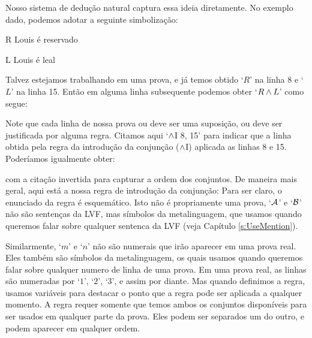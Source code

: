 Nosso sistema de dedu\c c\~ao natural  captura  essa ideia diretamente. No exemplo dado, podemos adotar a seguinte simboliza\c c\~ao:
	\begin{ekey}
		\item[R] Louis \'e reservado
		\item[L] Louis \'e leal
	\end{ekey}
 Talvez estejamos trabalhando em uma prova, e j\'a temos obtido `$R$'  na linha 8 e `$L$' na linha 15. Ent\~ao  em alguma linha subsequente podemos obter  `$R \wedge L$' como segue:
\begin{fitchproof}
	 
\end{fitchproof}

 Note que cada linha de nossa prova  ou deve ser uma suposi\c c\~ao, ou deve ser justificada por alguma regra.    Citamos  aqui   `$\wedge$I 8, 15' para indicar que a linha obtida pela regra da introdu\c c\~ao  da conjun\c c\~ao  ($\wedge$I) aplicada as linhas 8 e 15.  Poder\'iamos igualmente obter:
\begin{fitchproof}
	 
\end{fitchproof}
 
 com a cita\c c\~ao invertida para capturar a ordem  dos  conjuntos. 
De maneira mais geral, aqui est\'a  a nossa regra de introdu\c c\~ao da  conjun\c c\~ao:
Para ser claro, o enunciado da regra \'e esquem\'atico.  Isto n\~ao \'e propriamente uma prova,      `$\mathcal{A}$'  e `$\mathcal{B}$'  n\~ao s\~ao senten\c cas da LVF, mas s\'imbolos da metalinguagem, que usamos quando queremos falar sobre qualquer sentenca da LVF (veja Cap\'itulo \ref{s:UseMention}). 

Similarmente,  `$m$' e `$n$' n\~ao s\~ao numerais  que ir\~ao aparecer em uma prova real. Eles tamb\'em s\~ao s\'imbolos da metalinguagem, os quais usamos quando queremos falar sobre qualquer numero de linha  de uma prova. Em uma  prova real, as linhas  s\~ao numeradas por `$1$', `$2$', `$3$', e assim por diante.  Mas quando definimos a regra, usamos vari\'aveis   para destacar o ponto que a regra pode ser aplicada a qualquer momento.  A regra requer somente que temos ambos os conjuntos dispon\'iveis para ser usados em qualquer parte da prova. Eles podem ser separados um do outro, e podem aparecer em qualquer ordem.

